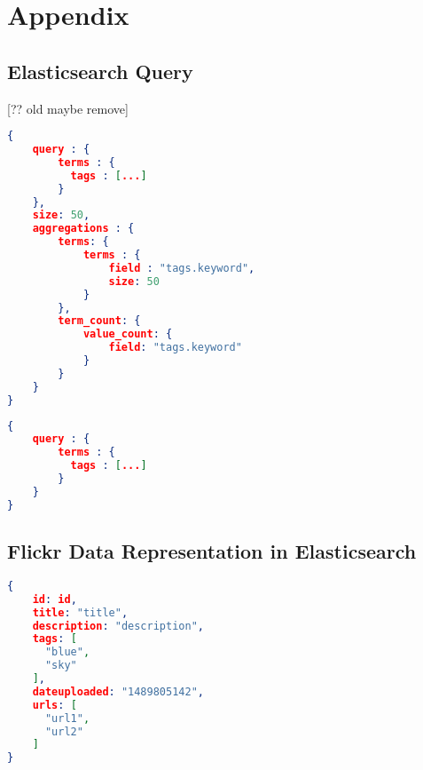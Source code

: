 \chapter{Appendix}

\section{Elasticsearch Query}
[?? old maybe remove]
\begin{lstlisting}[language=json, caption={Initial query to retrive query expansion data}, label={ap:initial-query}]
{
    query : {
        terms : {
          tags : [...]
        }
    },
    size: 50,
    aggregations : {
        terms: {
            terms : {
                field : "tags.keyword",
                size: 50
            }
        },
        term_count: {
            value_count: {
                field: "tags.keyword"
            }
        }
    }
}
\end{lstlisting}

\begin{lstlisting}[language=json, caption={Elasticsearch term search}, label={ap:final-query}]
{
    query : {
        terms : {
          tags : [...]
        }
    }
}
\end{lstlisting}

\section{Flickr Data Representation in Elasticsearch}
\begin{lstlisting}[language={json}, caption={Internal photo data representation in elasticsearch}, label={ap:flickr-data}]
{
    id: id,
    title: "title",
    description: "description",
    tags: [
      "blue",
      "sky"
    ],
    dateuploaded: "1489805142",
    urls: [
      "url1",
      "url2"
    ]
}
\end{lstlisting}


